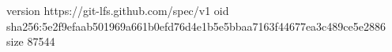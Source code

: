 version https://git-lfs.github.com/spec/v1
oid sha256:5e2f9efaab501969a661b0efd76d4e1b5e5bbaa7163f44677ea3c489ce5e2886
size 87544
